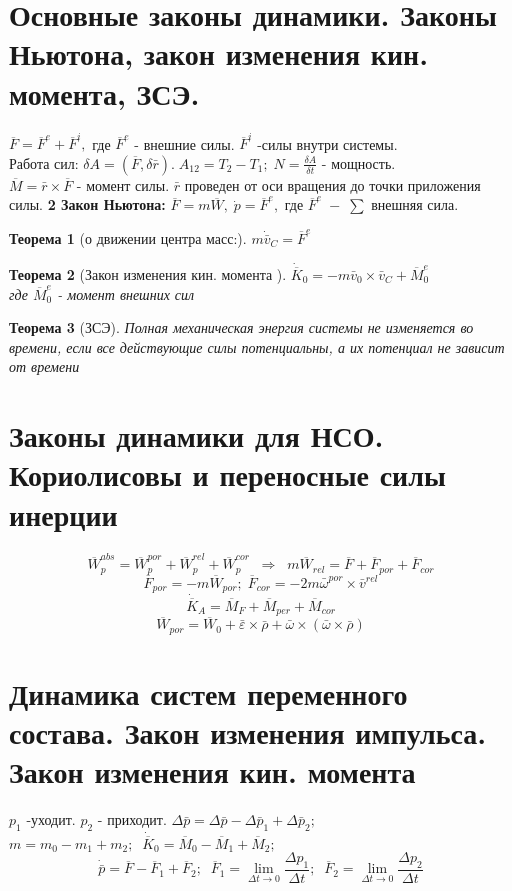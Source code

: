 \documentclass[12pt]{article}
\newtheorem{theorem}{Теорема}
\begin{document}
\section{Основные законы динамики. Законы Ньютона, закон изменения кин. момента, ЗСЭ.}
	$\overline{F}=\overline{F}^e + \overline{F}^i, $ где $\overline{F}^e$ - внешние силы. $\overline{F}^i$ -силы внутри системы.\\
	Работа сил: $\delta A = (\overline{F}, \delta \bar{r}).\; A_{12}=T_2-T_1;\; N=\frac{\delta A}{\delta t} $ - мощность.\\
	 $\overline{M}= \bar{r}\times \overline{F}$ - момент силы. $\bar{r} $ проведен от оси вращения до точки приложения силы.
	\textbf{2 Закон Ньютона: } $\overline{F} = m\overline{W}, \; \dot{p}=\overline{F}^e,$ где $\overline{F}^e\; - \; \sum$  внешняя сила.
	\begin{theorem}[о движении центра масс:] $m\dot{\bar{v}}_C = \overline{F}^e $
	\end{theorem}
	\begin{theorem}[Закон изменения кин. момента ] $\dot{\overline{K}}_0 = -m\bar{v}_0\times\bar{v}_C + \overline{M}_0^e $\\ где $\overline{M}_0^e $ - момент внешних сил
	\end{theorem}
	\begin{theorem}[ЗСЭ]
		Полная механическая энергия системы не изменяется во времени, если все действующие силы потенциальны, а их потенциал не зависит от времени
	\end{theorem}
	
\section{Законы динамики для НСО. Кориолисовы и переносные силы инерции}	
	\vspace{-30pt}
	$$\overline{W}_p^{abs} = \overline{W}_p^{por} + \overline{W}_p^{rel} + \overline{W}_p^{cor} \;\; \Rightarrow \;\;m\overline{W}_{rel} = \overline{F} + \overline{F}_{por} + \overline{F}_{cor} $$
	$$\overline{F}_{por} = -m\overline{W}_{por}; \; \overline{F}_{cor} = -2m\bar{\omega}^{por}\times \bar{v}^{rel} $$
	$$\dot{\overline{K}}_A = \overline{M}_F + \overline{M}_{per} + \overline{M}_{cor} $$
	$$\overline{W}_{por} = \overline{W}_0+ \bar{\varepsilon}\times \bar{\rho} + \bar{\omega}\times (\bar{\omega}\times \bar{\rho}) $$
	\vspace{-20pt}
\section{Динамика систем переменного состава. Закон изменения импульса. Закон изменения кин. момента}
	$p_1$ -уходит.  $p_2$ - приходит. $\Delta \bar{p}=\Delta \bar{p} - \Delta \bar{p}_1 + \Delta \bar{p}_2;\;$ \\
	$m= m_0 - m_1 +m_2;\;\; \dot{\overline{K}}_0 = \overline{M}_0 - \overline{M}_{1} + \overline{M}_{2};  $
	$$\dot{\bar{p}} = \overline{F} - \overline{F}_1 + \overline{F}_2; \; \;
	\overline{F}_1= \lim\limits_{\Delta t \rightarrow 0} \frac{\Delta p_1}{\Delta t};\;\;
	\overline{F}_2= \lim\limits_{\Delta t \rightarrow 0} \frac{\Delta p_2}{\Delta t} $$
	
\end{document}

